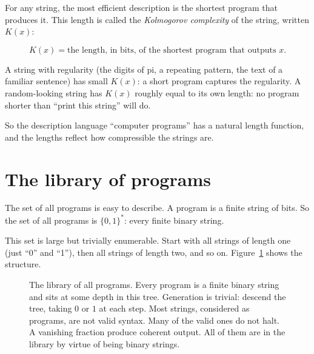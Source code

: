 For any string, the most efficient description is the shortest program that produces it. This length is called the \emph{Kolmogorov complexity} of the string, written $K(x)$:

$$K(x) = \text{the length, in bits, of the shortest program that outputs } x.$$

A string with regularity (the digits of pi, a repeating pattern, the text of a familiar sentence) has small $K(x)$: a short program captures the regularity. A random-looking string has $K(x)$ roughly equal to its own length: no program shorter than ``print this string'' will do.

So the description language ``computer programs'' has a natural length function, and the lengths reflect how compressible the strings are.

\section*{The library of programs}

The set of all programs is easy to describe. A program is a finite string of bits. So the set of all programs is $\{0, 1\}^*$: every finite binary string.

This set is large but trivially enumerable. Start with all strings of length one (just ``0'' and ``1''), then all strings of length two, and so on. Figure~\ref{fig:program-tree} shows the structure.

\begin{figure}[h]
\centering
{}
\caption{The library of all programs. Every program is a finite binary string and sits at some depth in this tree. Generation is trivial: descend the tree, taking $0$ or $1$ at each step. Most strings, considered as programs, are not valid syntax. Many of the valid ones do not halt. A vanishing fraction produce coherent output. All of them are in the library by virtue of being binary strings.}
\label{fig:program-tree}
\end{figure}


